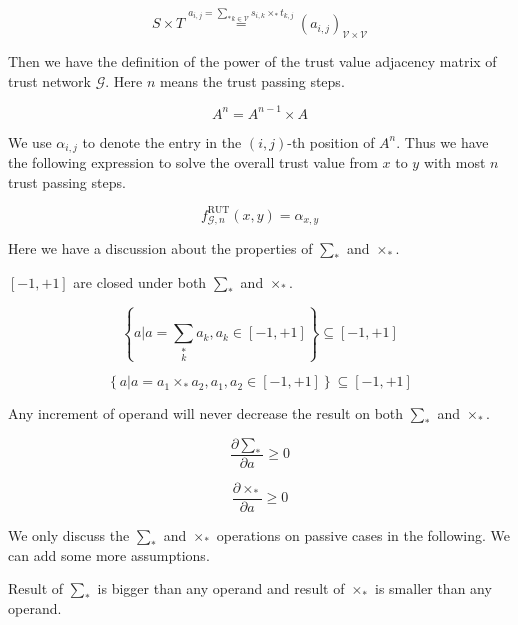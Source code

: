\documentclass{article}
\begin{document}
\begin{equation}
S\times T\overset{a_{i,j}=\underset{k\in \mathcal{V}}{\sum _*}s_{i,k}\times _*t_{k,j}}{=}\left(a_{i,j}\right)_{\mathcal{V}\times \mathcal{V}}
\end{equation}

Then we have the definition of the power of the trust value adjacency matrix of trust network \(\mathcal{G}\). Here \(n\) means the trust passing
steps.

\begin{equation}
A^n=A^{n-1}\times A
\end{equation}

We use \(\alpha _{i,j}\) to denote the entry in the \((i,j)\)-th position of \(A^n\). Thus we have the following expression to solve the overall
trust value from \(x\) to \(y\) with most \(n\) trust passing steps.

\begin{equation}
f_{\mathcal{G},n}^{\text{RUT}}(x,y)=\alpha _{x,y}
\end{equation}

Here we have a discussion about the properties of \(\sum _*\) and \(\times _*\).

\([-1,+1]\) are closed under both \(\sum _*\) and \(\times _*\).

\begin{equation}
\left\{a|a=\underset{k}{\sum _*}a_k,a_k\in [-1,+1]\right\}\subseteq [-1,+1]
\end{equation}

\begin{equation}
\left\{a|a=a_1\times _*a_2,a_1,a_2\in [-1,+1]\right\}\subseteq [-1,+1]
\end{equation}

Any increment of operand will never decrease the result on both \(\sum _*\) and \(\times _*\).

\begin{equation}
\frac{\partial \sum _*}{\partial a}\geq 0
\end{equation}

\begin{equation}
\frac{\partial \times _*}{\partial a}\geq 0
\end{equation}

We only discuss the \(\sum _*\) and \(\times _*\) operations on passive cases in the following. We can add some more assumptions.

Result of \(\sum _*\) is bigger than any operand and result of \(\times _*\) is smaller than any operand.
\end{document}
